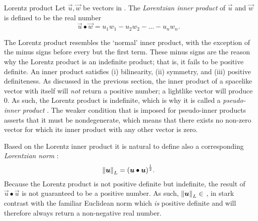 \begin{thmblock}{Lorentz product}
    Let \(\vec{u}, \vec{w}\) be vectors in . The \emph{Lorentzian inner product}  of \(\vec{u}\) and \(\vec{w}\) is defined to be the real number
    \begin{equation}
        \vec{u} \bullet \vec{w} = u_1w_1 - u_2w_2 - \ldots - u_nw_n.
        \label{eq:lorentz_product}
    \end{equation}
\end{thmblock}
The Lorentz product resembles the `normal'  inner product, with the exception of the minus signs before every but the first term. These minus signs are the reason why the Lorentz product is an indefinite product; that is, it fails to be positive definite. An inner product satisfies (i) bilinearity, (ii) symmetry, and (iii) positive definiteness. As discussed in the previous section, the inner product of a spacelike vector with itself will \emph{not} return a positive number;  a lightlike vector will produce 0. As such, the Lorentz product is indefinite, which is why it is called a \emph{pseudo-inner product} \cite{Ratcliffe2019,Schuller2014}. The weaker condition that is imposed for pseudo-inner products asserts that it must be nondegenerate, which means that there exists no non-zero vector for which its inner product with any other vector is zero.

Based on the Lorentz inner product it is natural to define also a corresponding \emph{Lorentzian norm} :
    \[
     \norm{\vb*{u}}_L = \qty(\vb*{u}\bullet\vb*{u})^\frac{1}{2}.
\]
Because the Lorentz product is not positive definite but indefinite, the result of \(\vec{u}\bullet\vec{u}\) is not guaranteed to be a positive number. As such, \(\norm{\vb*{u}}_L \in \) , in stark contrast with the familiar Euclidean norm which \emph{is} positive definite and will therefore always return a non-negative real number.

